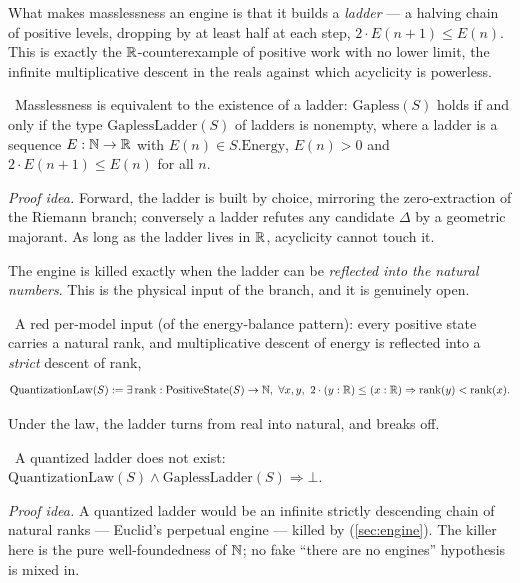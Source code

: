 What makes masslessness an engine is that it builds a \emph{ladder} --- a halving chain of positive
levels, dropping by at least half at each step, $2\cdot E(n+1)\le E(n)$. This is exactly the
$\mathbb{R}$-counterexample of positive work with no lower limit, the infinite multiplicative descent in
the reals against which acyclicity is powerless.

\begin{theorem}\label{thm:gapless_iff_nonempty_ladder}
\green{}\ Masslessness is equivalent to the existence of a ladder: $\mathrm{Gapless}(S)$ holds
if and only if the type $\mathrm{GaplessLadder}(S)$ of ladders is nonempty, where a ladder is a
sequence $E:\mathbb{N}\to\mathbb{R}$ with $E(n)\in S.\mathrm{Energy}$, $E(n)>0$ and $2\cdot E(n+1)\le E(n)$ for all
$n$.
\end{theorem}

\emph{Proof idea.} Forward, the ladder is built by choice, mirroring the zero-extraction of the
Riemann branch; conversely a ladder refutes any candidate $\Delta$ by a geometric majorant. As long
as the ladder lives in $\mathbb{R}$, acyclicity cannot touch it.

The engine is killed exactly when the ladder can be \emph{reflected into the natural numbers}. This
is the physical input of the branch, and it is genuinely open.

\begin{definition}\label{def:QuantizationLaw}
\red{}\ A red per-model input (of the energy-balance pattern): every positive state carries a
natural rank, and multiplicative descent of energy is reflected into a \emph{strict} descent of
rank,
\[
  \mathrm{QuantizationLaw}(S):=\exists\,\mathrm{rank}:\mathrm{PositiveState}(S)\to\N,\
    \forall x,y,\ 2\cdot(y:\R)\le(x:\R)\Rightarrow\mathrm{rank}(y)<\mathrm{rank}(x).
\]
\end{definition}

Under the law, the ladder turns from real into natural, and breaks off.

\begin{theorem}\label{thm:no_quantizedLadder}
\green{}\ A quantized ladder does not exist:
$\mathrm{QuantizationLaw}(S)\wedge\mathrm{GaplessLadder}(S)\Rightarrow\bot$.
\leantag{no\_quantizedLadder}
\end{theorem}

\emph{Proof idea.} A quantized ladder would be an infinite strictly descending chain of natural
ranks --- Euclid's perpetual engine --- killed by \code{no\_infinite\_descent}
(\cref{sec:engine}). The killer here is the pure well-foundedness of $\mathbb{N}$; no fake ``there are no
engines'' hypothesis is mixed in.

